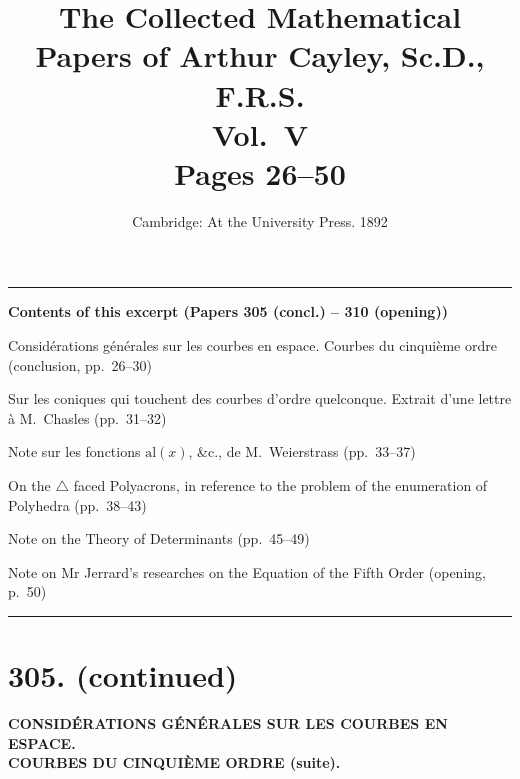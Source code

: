 \documentclass[11pt,a4paper]{article}
\title{\textbf{The Collected Mathematical Papers of Arthur Cayley, Sc.D., F.R.S.}\\[6pt]
\Large Vol.\ V\\[12pt]
\large Pages 26--50}
\author{}
\date{Cambridge: At the University Press. 1892}
\begin{document}
\maketitle
\thispagestyle{empty}

\vspace{2em}
\noindent\rule{\textwidth}{0.4pt}
\vspace{1em}

\begin{center}
\textbf{Contents of this excerpt (Papers 305 (concl.) -- 310 (opening))}
\end{center}

\begin{enumerate}[label={[\arabic*]}]
\setcounter{enumi}{304}
\item Consid\'{e}rations g\'{e}n\'{e}rales sur les courbes en espace. Courbes du cinqui\`{e}me ordre (conclusion, pp.\ 26--30)
\item Sur les coniques qui touchent des courbes d'ordre quelconque. Extrait d'une lettre \`{a} M.~Chasles (pp.\ 31--32)
\item Note sur les fonctions $\mathrm{al}(x)$, \&c., de M.~Weierstrass (pp.\ 33--37)
\item On the $\triangle$ faced Polyacrons, in reference to the problem of the enumeration of Polyhedra (pp.\ 38--43)
\item Note on the Theory of Determinants (pp.\ 45--49)
\item Note on Mr Jerrard's researches on the Equation of the Fifth Order (opening, p.\ 50)
\end{enumerate}

\vspace{1em}
\noindent\rule{\textwidth}{0.4pt}
\vspace{2em}

\section*{305. (continued)}

\begin{center}
\textbf{CONSID\'{E}RATIONS G\'{E}N\'{E}RALES SUR LES COURBES EN ESPACE.}\\[0.5em]
\textbf{COURBES DU CINQUI\`{E}ME ORDRE (suite).}
\end{center}
\end{document}
